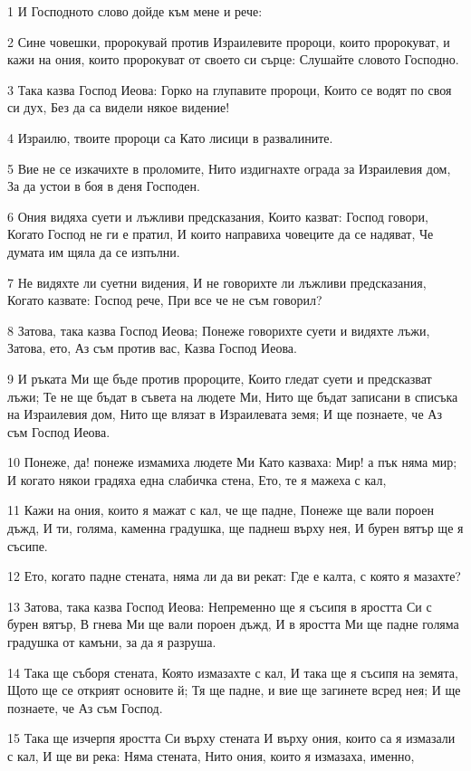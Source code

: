 \par 1 И Господното слово дойде към мене и рече:
\par 2 Сине човешки, пророкувай против Израилевите пророци, които пророкуват, и кажи на ония, които пророкуват от своето си сърце: Слушайте словото Господно.
\par 3 Така казва Господ Иеова: Горко на глупавите пророци, Които се водят по своя си дух, Без да са видели някое видение!
\par 4 Израилю, твоите пророци са Като лисици в развалините.
\par 5 Вие не се изкачихте в проломите, Нито издигнахте ограда за Израилевия дом, За да устои в боя в деня Господен.
\par 6 Ония видяха суети и лъжливи предсказания, Които казват: Господ говори, Когато Господ не ги е пратил, И които направиха човеците да се надяват, Че думата им щяла да се изпълни.
\par 7 Не видяхте ли суетни видения, И не говорихте ли лъжливи предсказания, Когато казвате: Господ рече, При все че не съм говорил?
\par 8 Затова, така казва Господ Иеова; Понеже говорихте суети и видяхте лъжи, Затова, ето, Аз съм против вас, Казва Господ Иеова.
\par 9 И ръката Ми ще бъде против пророците, Които гледат суети и предсказват лъжи; Те не ще бъдат в съвета на людете Ми, Нито ще бъдат записани в списъка на Израилевия дом, Нито ще влязат в Израилевата земя; И ще познаете, че Аз съм Господ Иеова.
\par 10 Понеже, да! понеже измамиха людете Ми Като казваха: Мир! а пък няма мир; И когато някои градяха една слабичка стена, Ето, те я мажеха с кал,
\par 11 Кажи на ония, които я мажат с кал, че ще падне, Понеже ще вали пороен дъжд, И ти, голяма, каменна градушка, ще паднеш върху нея, И бурен вятър ще я съсипе.
\par 12 Ето, когато падне стената, няма ли да ви рекат: Где е калта, с която я мазахте?
\par 13 Затова, така казва Господ Иеова: Непременно ще я съсипя в яростта Си с бурен вятър, В гнева Ми ще вали пороен дъжд, И в яростта Ми ще падне голяма градушка от камъни, за да я разруша.
\par 14 Така ще съборя стената, Която измазахте с кал, И така ще я съсипя на земята, Щото ще се открият основите й; Тя ще падне, и вие ще загинете всред нея; И ще познаете, че Аз съм Господ.
\par 15 Така ще изчерпя яростта Си върху стената И върху ония, които са я измазали с кал, И ще ви река: Няма стената, Нито ония, които я измазаха, именно,
